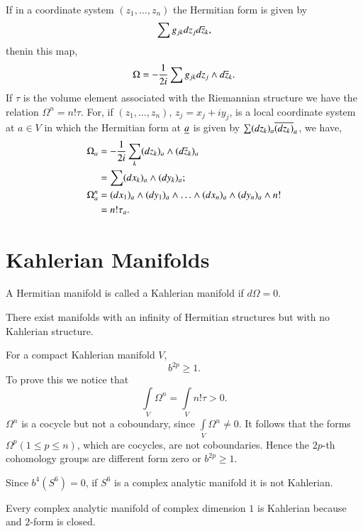 If in a coordinate system $(z_{1},\ldots,z_{n})$ the Hermitian form is
given by 
$$
\sum g_{jk}dz_{j}d\overline{z}_{k},
$$
then\pageoriginale in this map,
$$
\Omega=-\frac{1}{2i}\sum g_{jk}dz_{j}\wedge d\overline{z}_{k}.
$$
If $\tau$ is the volume element associated with the Riemannian
structure we have the relation $\Omega^{n}=n!\tau$. For, if
$(z_{1},\ldots,z_{n})$, $z_{j}=x_{j}+iy_{j}$, is a local coordinate
system at $a\in V$ in which the Hermitian form at $\underline{a}$ is given by
$\sum (dz_{k})_{a}\overline{(dz_{k})}_{a}$, we have,
\begin{align*}
\Omega_{a} &= -\frac{1}{2i}\sum_{k}(dz_{k})_{a}\wedge
(d\overline{z}_{k})_{a}\\
&= \sum (dx_{k})_{a}\wedge (dy_{k})_{a};\\
\Omega^{n}_{a} &= (dx_{1})_{a}\wedge (dy_{1})_{a}\wedge\ldots\wedge
(dx_{n})_{a}\wedge (dy_{n})_{a}\wedge n!\\
&= n!\tau_{a}.
\end{align*}

\section*{Kahlerian Manifolds}

A Hermitian manifold is called a Kahlerian manifold if $d\Omega=0$.

There exist manifolds with an infinity of Hermitian structures but
with no Kahlerian structure.

For a compact Kahlerian manifold $V$,
$$
b^{2p}\geq 1.
$$
To prove this we notice that
$$
\int\limits_{V}\Omega^{n}=\int\limits_{V}n!\tau>0.
$$\pageoriginale
$\Omega^{n}$ is a cocycle but not a coboundary, since
$\int\limits_{V}\Omega^{n}\neq 0$. It follows that the forms
$\Omega^{p}(1\leq p\leq n)$, which are cocycles, are not
coboundaries. Hence the $2p$-th cohomology groups are different form
zero or $b^{2p}\geq 1$.

Since $b^{4}(S^{6})=0$, if $S^{6}$ is a complex analytic manifold it
is not Kahlerian.

Every complex analytic manifold of complex dimension $1$ is Kahlerian
because and $2$-form is closed.



